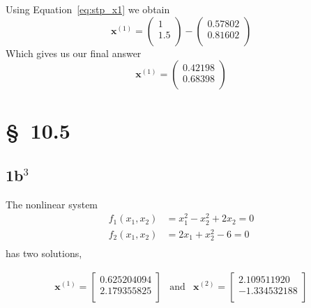\documentclass[12pt]{article}
\begin{document}
Using Equation~\ref{eq:stp_x1} we obtain
\begin{equation*}
  \label{eq:stp_x1_numeric}
  \mathbf{x}^{(1)}=
  \begin{pmatrix}
    1 \\
    1.5 \\
  \end{pmatrix} - 
  \begin{pmatrix}
    0.57802 \\
    0.81602 \\
  \end{pmatrix}  
\end{equation*}
Which gives us our final answer
\begin{equation*}
\label{eq:stp_x1_answer}
\boxed{\mathbf{x}^{(1)}=
  \begin{pmatrix}
    0.42198 \\
    0.68398 \\
  \end{pmatrix}}
\end{equation*}

\begin{minipage}[h]{1.0\linewidth}
  
\end{minipage}

\section{\S~10.5}
\subsection{1b$^3$}
The nonlinear system
\begin{align*}
  f_1(x_1,x_2)&=x_1^2-x_2^2+2x_2 =0 \\
  f_2(x_1,x_2)&=2x_1+x_2^2-6 =0 \\
\end{align*}
has two solutions,

\begin{equation*}
  \begin{array}{ccc}
    \mathbf{x}^{(1)}=
    \begin{bmatrix}
      0.625204094 \\
      2.179355825 \\
    \end{bmatrix}
    &
    \mathrm{and}
    &
    \mathbf{x}^{(2)}=
    \begin{bmatrix}
      2.109511920 \\
      −1.334532188 \\
    \end{bmatrix}
  \end{array}
\end{equation*}
\end{document}
